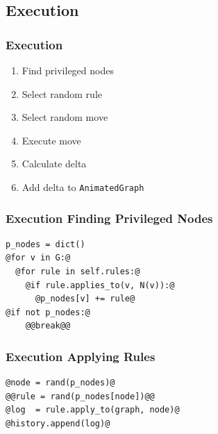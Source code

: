 \documentclass{beamer}
\begin{document}
\subsection{Execution}
\begin{frame}
  \frametitle{Execution}
  \begin{enumerate}[<+->]
  \item Find privileged nodes
  \item Select random rule
  \item Select random move
  \item Execute move
  \item Calculate delta
  \item Add delta to \texttt{AnimatedGraph}
  \end{enumerate}
\end{frame}
\begin{frame}[fragile]
  \frametitle{Execution \Dash Finding Privileged Nodes}
\qquad\begin{minipage}{.8\textwidth}
\begin{lstlisting}[style=pystep]
p_nodes = dict()
@for v in G:@
  @for rule in self.rules:@
    @if rule.applies_to(v, N(v)):@
      @p_nodes[v] += rule@
@if not p_nodes:@
    @@break@@
\end{lstlisting}
\end{minipage}
\end{frame}
\begin{frame}[fragile]
  \frametitle{Execution \Dash Applying Rules}
\qquad\begin{minipage}{.8\textwidth}
\begin{lstlisting}[style=pystep]
@node = rand(p_nodes)@
@@rule = rand(p_nodes[node])@@
@log  = rule.apply_to(graph, node)@
@history.append(log)@
\end{lstlisting}
\end{minipage}
\end{frame}
\end{document}
